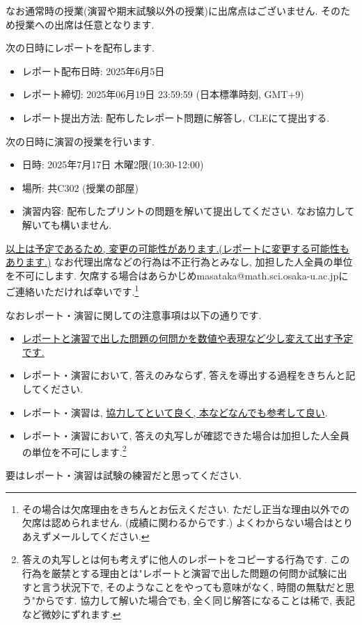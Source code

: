 \documentclass[dvipdfmx,a4paper,11pt]{article}
\theoremstyle{definition}
\begin{document}
なお通常時の授業(演習や期末試験以外の授業)に出席点はございません. そのため授業への出席は任意となります. 

\medskip
{}

次の日時にレポートを配布します. 
\begin{itemize}
  \setlength{\parskip}{0cm} 
  \setlength{\itemsep}{0cm}
\item レポート配布日時: 2025年6月5日
\item レポート締切: 2025年06月19日 23:59:59 (日本標準時刻, GMT+9)
\item レポート提出方法: 配布したレポート問題に解答し, CLEにて提出する. 
\end{itemize}


次の日時に演習の授業を行います. 
\begin{itemize}
  \setlength{\parskip}{0cm} 
  \setlength{\itemsep}{0cm}
\item 日時: 2025年7月17日 木曜2限(10:30-12:00) 
\item 場所: 共C302 (授業の部屋)
\item 演習内容: 配布したプリントの問題を解いて提出してください. なお協力して解いても構いません. 
\end{itemize}
\underline{以上は予定であるため, 変更の可能性があります.(レポートに変更する可能性もあります.)} 
なお代理出席などの行為は不正行為とみなし, 加担した人全員の単位を不可にします.
欠席する場合はあらかじめmasataka@math.sci.osaka-u.ac.jpにご連絡いただければ幸いです.\footnote{その場合は欠席理由をきちんとお伝えください. ただし正当な理由以外での欠席は認められません. (成績に関わるからです.) よくわからない場合はとりあえずメールしてください.}

なおレポート・演習に関しての注意事項は以下の通りです. 


\begin{itemize}
  \setlength{\parskip}{0cm} 
  \setlength{\itemsep}{0cm}
\item \underline{レポートと演習で出した問題の何問かを数値や表現など少し変えて出す予定です.} 
\item レポート・演習において, 答えのみならず, 答えを導出する過程をきちんと記してください. 
\item レポート・演習は, \underline{協力してといて良く, 本などなんでも参考して良い}.
\item レポート・演習において, 答えの丸写しが確認できた場合は加担した人全員の単位を不可にします.\footnote{答えの丸写しとは何も考えずに他人のレポートをコピーする行為です. この行為を厳禁とする理由とは"レポートと演習で出した問題の何問か試験に出すと言う状況下で, そのようなことをやっても意味がなく, 時間の無駄だと思う"からです. 協力して解いた場合でも, 全く同じ解答になることは稀で, 表記など微妙にずれます. }
\end{itemize}
\vspace{-12pt}
要はレポート・演習は試験の練習だと思ってください.
\end{document}
